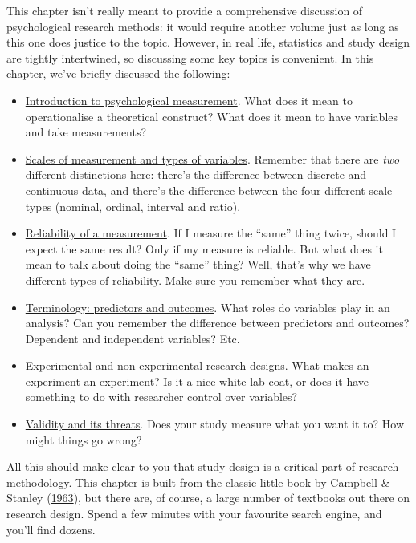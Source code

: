 \documentclass[
]{book}
\providecommand{\tightlist}{%
  \setlength{\itemsep}{0pt}\setlength{\parskip}{0pt}}
\theoremstyle{definition}
\theoremstyle{definition}
\theoremstyle{definition}
\theoremstyle{definition}
\theoremstyle{remark}
\begin{document}
This chapter isn't really meant to provide a comprehensive discussion of psychological research methods: it would require another volume just as long as this one does justice to the topic. However, in real life, statistics and study design are tightly intertwined, so discussing some key topics is convenient. In this chapter, we've briefly discussed the following:

\begin{itemize}
\tightlist
\item
  \protect\hyperlink{measurement}{Introduction to psychological measurement}. What does it mean to operationalise a theoretical construct? What does it mean to have variables and take measurements?
\item
  \protect\hyperlink{scales}{Scales of measurement and types of variables}. Remember that there are \emph{two} different distinctions here: there's the difference between discrete and continuous data, and there's the difference between the four different scale types (nominal, ordinal, interval and ratio).
\item
  \protect\hyperlink{reliability}{Reliability of a measurement}. If I measure the ``same'' thing twice, should I expect the same result? Only if my measure is reliable. But what does it mean to talk about doing the ``same'' thing? Well, that's why we have different types of reliability. Make sure you remember what they are.
\item
  \protect\hyperlink{ivdv}{Terminology: predictors and outcomes}. What roles do variables play in an analysis? Can you remember the difference between predictors and outcomes? Dependent and independent variables? Etc.
\item
  \protect\hyperlink{researchdesigns}{Experimental and non-experimental research designs}. What makes an experiment an experiment? Is it a nice white lab coat, or does it have something to do with researcher control over variables?
\item
  \protect\hyperlink{validity}{Validity and its threats}. Does your study measure what you want it to? How might things go wrong?
\end{itemize}

All this should make clear to you that study design is a critical part of research methodology. This chapter is built from the classic little book by Campbell \& Stanley (\protect\hyperlink{ref-Campbell1963}{1963}), but there are, of course, a large number of textbooks out there on research design. Spend a few minutes with your favourite search engine, and you'll find dozens.
\end{document}
